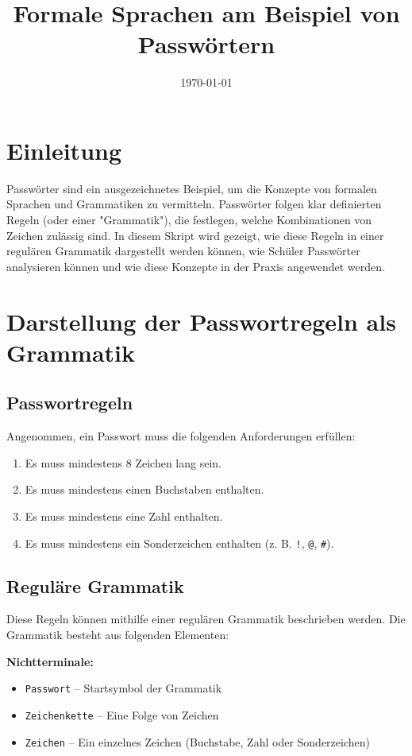 \documentclass[a4paper,12pt]{article}
\begin{document}
	
	\title{Formale Sprachen am Beispiel von Passwörtern}
	\author{}
	\date{\today}
	\maketitle
	
	\section{Einleitung}
	Passwörter sind ein ausgezeichnetes Beispiel, um die Konzepte von formalen Sprachen und Grammatiken zu vermitteln. Passwörter folgen klar definierten Regeln (oder einer "Grammatik"), die festlegen, welche Kombinationen von Zeichen zulässig sind.  
	In diesem Skript wird gezeigt, wie diese Regeln in einer regulären Grammatik dargestellt werden können, wie Schüler Passwörter analysieren können und wie diese Konzepte in der Praxis angewendet werden.
	
	\section{Darstellung der Passwortregeln als Grammatik}
	
	\subsection{Passwortregeln}
	Angenommen, ein Passwort muss die folgenden Anforderungen erfüllen:
	\begin{enumerate}
		\item Es muss mindestens 8 Zeichen lang sein.
		\item Es muss mindestens einen Buchstaben enthalten.
		\item Es muss mindestens eine Zahl enthalten.
		\item Es muss mindestens ein Sonderzeichen enthalten (z. B. \texttt{!}, \texttt{@}, \texttt{\#}).
	\end{enumerate}
	
	\subsection{Reguläre Grammatik}
	Diese Regeln können mithilfe einer regulären Grammatik beschrieben werden. Die Grammatik besteht aus folgenden Elementen:
	
	\textbf{Nichtterminale:}
	\begin{itemize}
		\item \texttt{Passwort} – Startsymbol der Grammatik
		\item \texttt{Zeichenkette} – Eine Folge von Zeichen
		\item \texttt{Zeichen} – Ein einzelnes Zeichen (Buchstabe, Zahl oder Sonderzeichen)
	\end{itemize}
	
\end{document}
